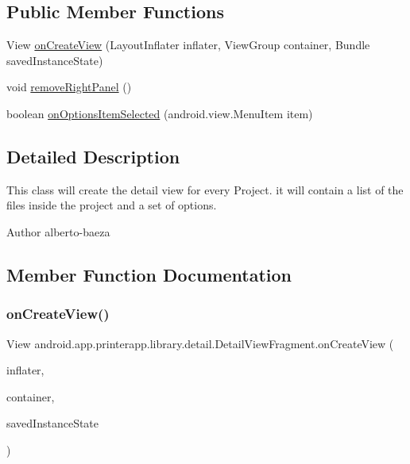\subsection*{Public Member Functions}
\begin{DoxyCompactItemize}
\item 
View \hyperlink{classandroid_1_1app_1_1printerapp_1_1library_1_1detail_1_1_detail_view_fragment_aef93791554c2ae0cb1a4bbf8d6865b03}{on\+Create\+View} (Layout\+Inflater inflater, View\+Group container, Bundle saved\+Instance\+State)
\item 
void \hyperlink{classandroid_1_1app_1_1printerapp_1_1library_1_1detail_1_1_detail_view_fragment_af821fe212448ea354f59c5c261ade09d}{remove\+Right\+Panel} ()
\item 
boolean \hyperlink{classandroid_1_1app_1_1printerapp_1_1library_1_1detail_1_1_detail_view_fragment_a76aa2d93dd34430351ba00bca545c560}{on\+Options\+Item\+Selected} (android.\+view.\+Menu\+Item item)
\end{DoxyCompactItemize}


\subsection{Detailed Description}
This class will create the detail view for every Project. it will contain a list of the files inside the project and a set of options.

\begin{DoxyAuthor}{Author}
alberto-\/baeza 
\end{DoxyAuthor}


\subsection{Member Function Documentation}
\mbox{\label{classandroid_1_1app_1_1printerapp_1_1library_1_1detail_1_1_detail_view_fragment_aef93791554c2ae0cb1a4bbf8d6865b03}} 
\subsubsection{\texorpdfstring{on\+Create\+View()}{onCreateView()}}
{\footnotesize\ttfamily View android.\+app.\+printerapp.\+library.\+detail.\+Detail\+View\+Fragment.\+on\+Create\+View (\begin{DoxyParamCaption}\item[{Layout\+Inflater}]{inflater,  }\item[{View\+Group}]{container,  }\item[{Bundle}]{saved\+Instance\+State }\end{DoxyParamCaption})}

